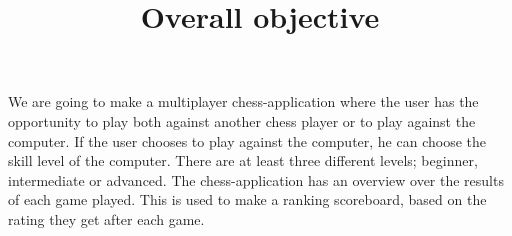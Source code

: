 \documentclass{article}
\title{Overall objective}
\begin{document}
\date{}
\maketitle
{}


We are going to make a multiplayer chess-application where the user has the opportunity to play both against another chess player or to play against the computer. If the user chooses to play against the computer, he can choose the skill level of the computer. There are at least three different levels; beginner, intermediate or advanced.
\newline \newline
The chess-application has an overview over the results of each game played. This is used to make a ranking scoreboard, based on the rating they get after each game.
\end{document}
